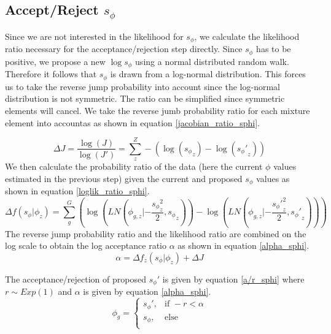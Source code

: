 \documentclass[11pt]{article}
\begin{document}
  \subsection{Accept/Reject $s_{\phi}$}
  Since we are not interested in the likelihood for $s_{\phi}$, we calculate the likelihood ratio necessary for the acceptance/rejection step directly.
  Since $s_{\phi}$ has to be positive, we propose a new $\log{s_{\phi}}$ using a normal distributed random walk.
  Therefore it follows that $s_{\phi}$ is drawn from a log-normal distribution. This forces us to take the reverse jump probability into account since the log-normal distribution is not symmetric. The ratio can be simplified since symmetric
  elements will cancel. We take the reverse jumb probability ratio for each mixture element into accountas as shown in equation \ref{jacobian_ratio_sphi}.
  
  \begin{equation}
    \Delta J = \frac{\log(J)}{\log(J')} = \sum_z^Z -(\log({s_{\phi}}_z) - \log({s_{\phi}'}_z))
    \label{jacobian_ratio_sphi}
  \end{equation}
  We then calculate the probability ratio of the data (here the current $\phi$ values estimated in the previous step) given the current and proposed $s_{\phi}$ values as shown in equation \ref{loglik_ratio_sphi}.
  \begin{equation}
    \Delta f(s_{\phi}|\phi_z) = \sum_g^G \left(\log(LN(\phi_{g,z} | -\frac{{s_{\phi}}_z^2}{2}, {s_{\phi}}_z)) - \log(LN(\phi_{g,z} | -\frac{{s_{\phi}'}_z^2}{2}, {s_{\phi}'}_z)) \right)
    \label{loglik_ratio_sphi}
  \end{equation}
  The reverse jump probability ratio and the likelihood ratio are combined on the log scale to obtain the log acceptance ratio $\alpha$ as shown in equation \ref{alpha_sphi}.
  \begin{equation}
    \alpha = \Delta f_z(s_{\phi}|\phi_z) + \Delta J
    \label{alpha_sphi}
  \end{equation}
  
 
  The acceptance/rejection of proposed $s_{\phi}'$ is given by equation \ref{a/r_sphi} where $r \sim Exp(1)$ and $\alpha$ is given by equation \ref{alpha_sphi}.
  \begin{equation}
    \phi_g = 
    \begin{cases}
      s_{\phi}',	& \text{if } -r < \alpha \\
      s_{\phi},		& \text{else } \\
    \end{cases}
     \label{a/r_sphi}
  \end{equation}    
  
\end{document}
